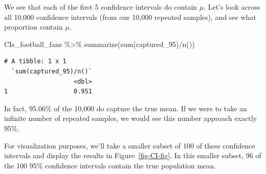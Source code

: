 \documentclass[
  letterpaper,
  DIV=11,
  numbers=noendperiod]{scrreprt}
\newenvironment{Shaded}{\begin{snugshade}}{\end{snugshade}}
\newcommand{\FunctionTok}[1]{\textcolor[rgb]{0.28,0.35,0.67}{#1}}
\newcommand{\NormalTok}[1]{\textcolor[rgb]{0.00,0.23,0.31}{#1}}
\newcommand{\SpecialCharTok}[1]{\textcolor[rgb]{0.37,0.37,0.37}{#1}}
\theoremstyle{definition}
\theoremstyle{remark}
\begin{document}
We see that each of the first 5 confidence intervals do contain \(\mu\).
Let's look across all 10,000 confidence intervals (from our 10,000
repeated samples), and see what proportion contain \(\mu\).

\begin{Shaded}
\begin{Highlighting}[]
\NormalTok{CIs\_football\_fans }\SpecialCharTok{\%\textgreater{}\%} 
  \FunctionTok{summarize}\NormalTok{(}\FunctionTok{sum}\NormalTok{(captured\_95)}\SpecialCharTok{/}\FunctionTok{n}\NormalTok{())}
\end{Highlighting}
\end{Shaded}

\begin{verbatim}
# A tibble: 1 x 1
  `sum(captured_95)/n()`
                   <dbl>
1                  0.951
\end{verbatim}

In fact, 95.06\% of the 10,000 do capture the true mean. If we were to
take an infinite number of repeated samples, we would see this number
approach exactly 95\%.

For visualization purposes, we'll take a smaller subset of 100 of these
confidence intervals and display the results in Figure~\ref{fig-CI-fig}.
In this smaller subset, 96 of the 100 95\% confidence intervals contain
the true population mean.
\end{document}
